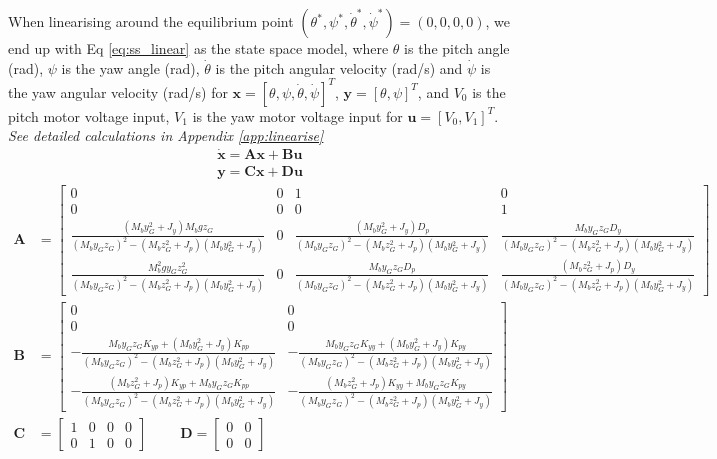 \documentclass[11pt]{article}
\begin{document}
When linearising around the equilibrium point $(\theta^{*}, \psi^{*}, \dot{\theta}^{*}, \dot{\psi}^{*}) = (0,0,0,0)$, we end up with Eq \ref{eq:ss_linear} as the state space model, where $\theta$ is the pitch angle (rad), $\psi$ is the yaw angle (rad), $\dot{\theta}$ is the pitch angular velocity (rad/s) and $\dot{\psi}$ is the yaw angular velocity (rad/s) for $\mathbf{x} = [\theta, \psi, \dot{\theta}, \dot{\psi}]^{T}$, $\mathbf{y} = [\theta, \psi]^T$, and $V_0$ is the pitch motor voltage input, $V_1$ is the yaw motor voltage input for $\mathbf{u} = [V_0, V_1]^T$. \textit{See detailed calculations in Appendix \ref{app:linearise}}
\begin{equation}\label{eq:ss_linear}
\begin{array}{ccc}
    \mathbf{\dot{x}} = \mathbf{A}\mathbf{x} + \mathbf{B}\mathbf{u}
    \\
    \mathbf{y} = \mathbf{C}\mathbf{x} + \mathbf{D}\mathbf{u}
\end{array}
\end{equation}
\begin{align*}
\mathbf{A} &= \begin{bmatrix}
    0 & 0 & 1 & 0\\
    0 & 0 & 0 & 1\\
    \frac{(M_b y^2_G + J_y)M_b g z_G}{(M_b y_G  z_G)^2 - (M_b z^2_G + J_p)(M_b y^2_G + J_y)} & 0 & \frac{(M_b y^2_G + J_y) D_p}{(M_b y_G  z_G)^2 - (M_b z^2_G + J_p)(M_b y^2_G + J_y)} & \frac{M_b y_G  z_G D_y}{(M_b y_G  z_G)^2 - (M_b z^2_G + J_p)(M_b y^2_G + J_y)}\\
    \frac{M^2_b g y_G z^2_G}{(M_b y_G  z_G)^2 - (M_b z^2_G + J_p)(M_b y^2_G + J_y)} & 0 & \frac{M_b y_G  z_G D_p}{(M_b y_G  z_G)^2 - (M_b z^2_G + J_p)(M_b y^2_G + J_y)} & \frac{(M_b z^2_G + J_p) D_y}{(M_b y_G  z_G)^2 - (M_b z^2_G + J_p)(M_b y^2_G + J_y)}
    \end{bmatrix}\\
\mathbf{B} &= \begin{bmatrix}
    0 & 0\\
    0 & 0\\
    -\frac{M_b y_G  z_G K_{yp} + (M_b y^2_G + J_y) K_{pp}}{(M_b y_G  z_G)^2 - (M_b z^2_G + J_p)(M_b y^2_G + J_y)} & -\frac{M_b y_G  z_G K_{yy} + (M_b y^2_G + J_y) K_{py}}{(M_b y_G  z_G)^2 - (M_b z^2_G + J_p)(M_b y^2_G + J_y)}\\
    -\frac{(M_b z^2_G + J_p) K_{yp} + M_b y_G  z_G K_{pp}}{(M_b y_G  z_G)^2 - (M_b z^2_G + J_p)(M_b y^2_G + J_y)} & -\frac{(M_b z^2_G + J_p) K_{yy} + M_b y_G  z_G K_{py}}{(M_b y_G  z_G)^2 - (M_b z^2_G + J_p)(M_b y^2_G + J_y)}
    \end{bmatrix}\\
\mathbf{C} &= \begin{bmatrix}
    1 & 0 & 0 & 0\\
    0 & 1 & 0 & 0
    \end{bmatrix} \hspace{1cm}
\mathbf{D} = \begin{bmatrix}
    0 & 0\\
    0 & 0
\end{bmatrix}
\end{align*}
\end{document}
